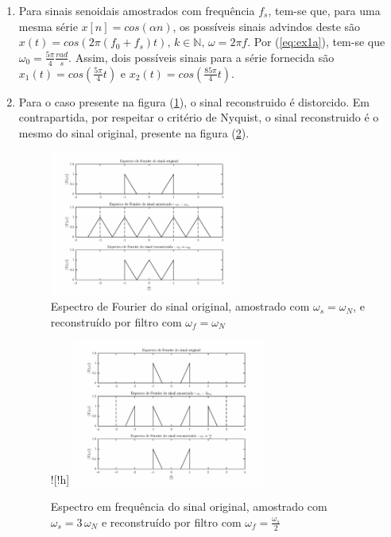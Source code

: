 \documentclass{article}
\begin{document}
\begin{enumerate}
\item %
Para sinais senoidais amostrados com frequência $f_s$, tem-se que, para uma mesma série $x[n] = cos(\alpha n)$, os possíveis sinais advindos deste são $x(t) = cos(2 \pi (f_0 + f_s)t) \mbox{, } k \in \mathbb{N} \mbox{, } \omega = 2 \pi f$. Por (\ref{eq:ex1a}), tem-se que $\omega_0 = \frac{5\pi}{4} \frac{rad}{s}$. Assim, dois possíveis sinais para a série fornecida são $x_1(t) = cos(\frac{5\pi}{4} t )$ e $x_2(t) = cos(\frac{85\pi}{4} t)$.

\item %

Para o caso presente na figura (\ref{fig:ex1d1}), o sinal reconstruido é distorcido. Em contrapartida, por respeitar o critério de Nyquist, o sinal reconstruido é o mesmo do sinal original, presente na figura (\ref{fig:ex1d2}).

\begin{figure}[!h]
    \centering
    \includegraphics[width=0.6\textwidth]{./images/ex1d1.eps}
    \caption{Espectro de Fourier do sinal original, amostrado com $\omega_s = \omega_N$, e reconstruído por  filtro com $\omega_f = \omega_N$}
    \label{fig:ex1d1}
\end{figure}%

\begin{figure}![!h]
    \centering
    \includegraphics[width=0.6\textwidth]{./images/ex1d2.eps}
    \caption{Espectro em frequência do sinal original, amostrado com $\omega_s = 3 \, \omega_N$ e reconstruído por  filtro com $\omega_f = \frac{\omega_s}{2}$}
    \label{fig:ex1d2}
\end{figure}

\end{enumerate}
\end{document}
